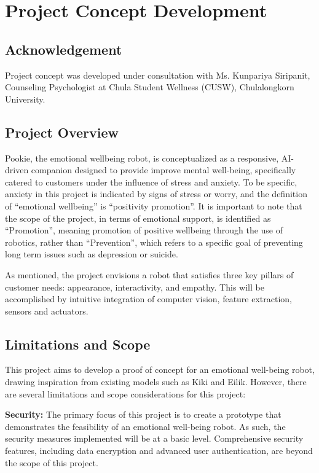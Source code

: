 \section{Project Concept Development}

\subsection{Acknowledgement}
Project concept was developed under consultation with Ms. Kunpariya Siripanit, Counseling Psychologist at Chula Student Wellness (CUSW), Chulalongkorn University.

\subsection{Project Overview}
Pookie, the emotional wellbeing robot, is conceptualized as a responsive, AI-driven companion designed to provide  improve mental well-being, specifically catered to customers under the influence of stress and anxiety. To be specific, anxiety in this project is indicated by signs of stress or worry, and the definition of “emotional wellbeing” is “positivity promotion”. It is important to note that the scope of the project, in terms of emotional support, is identified as “Promotion”, meaning promotion of positive wellbeing through the use of robotics, rather than “Prevention”, which refers to a specific goal of preventing long term issues such as depression or suicide.

As mentioned, the project envisions a robot that satisfies three key pillars of customer needs: appearance, interactivity, and empathy. This will be accomplished by intuitive integration of computer vision, feature extraction, sensors and actuators.

\subsection{Limitations and Scope}
This project aims to develop a proof of concept for an emotional well-being robot, drawing inspiration from existing models such as Kiki and Eilik. However, there are several limitations and scope considerations for this project:

\textbf{Security:} The primary focus of this project is to create a prototype that demonstrates the feasibility of an emotional well-being robot. As such, the security measures implemented will be at a basic level. Comprehensive security features, including data encryption and advanced user authentication, are beyond the scope of this project.

